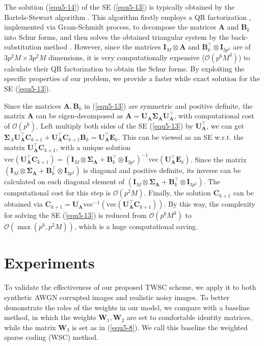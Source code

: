 The solution (\ref{equ5-14}) of the SE (\ref{equ5-13}) is typically obtained by the Bartels-Stewart algorithm \cite{Bartels1972}. This algorithm firstly employs a QR factorization \cite{GolubMatrix}, implemented via Gram-Schmidt process, to decompose the matrices $\bm{A}$ and $\bm{B}_{k}$ into Schur forms, and then solves the obtained triangular system by the back-substitution method \cite{bareiss1968sylvester}. However, since the matrices $\bm{I}_{M}\otimes\bm{A}$ and $\bm{B}_{k}^{\top}\otimes\bm{I}_{3p^2}$ are of $3p^2M\times 3p^2M$ dimensions, it is very computationally expensive ($\mathcal{O}(p^6M^3)$) to calculate their QR factorization to obtain the Schur forms. By exploiting the specific properties of our problem, we provide a faster while exact solution for the SE (\ref{equ5-13}).

Since the matrices $\bm{A},\bm{B}_{k}$ in (\ref{equ5-13}) are symmetric and positive definite, the matrix $\bm{A}$ can be eigen-decomposed as $\bm{A}=\bm{U}_{\bm{A}}\bm{\Sigma}_{\bm{A}}\bm{U}_{\bm{A}}^{\top}$, with computational cost of $\mathcal{O}(p^6)$. Left multiply both sides of the SE (\ref{equ5-13}) by $\bm{U}_{\bm{A}}^{\top}$, we can get
$
\bm{\Sigma}_{A}\bm{U}_{\bm{A}}^{\top}\bm{C}_{k+1}
+
\bm{U}_{\bm{A}}^{\top}\bm{C}_{k+1}\bm{B}_{k}
=
\bm{U}_{\bm{A}}^{\top}\bm{E}_{k}
$.
This can be viewed as an SE w.r.t. the matrix $\bm{U}_{\bm{A}}^{\top}\bm{C}_{k+1}$, with a unique solution
$
\text{vec}(\bm{U}_{\bm{A}}^{\top}\bm{C}_{k+1})=(\bm{I}_{M}\otimes\bm{\Sigma}_{\bm{A}}
+
\bm{B}_{k}^{\top}\otimes\bm{I}_{3p^2})^{-1}
\text{vec}(\bm{U}_{\bm{A}}^{\top}\bm{E}_{k})
$.
Since the matrix $(\bm{I}_{M}\otimes\bm{\Sigma}_{\bm{A}}
+
\bm{B}_{k}^{\top}\otimes\bm{I}_{3p^2})$ is diagonal and positive definite, its inverse can be calculated on each diagonal element of 
$(\bm{I}_{M}\otimes\bm{\Sigma}_{\bm{A}}
+
\bm{B}_{k}^{\top}\otimes\bm{I}_{3p^2})$. The computational cost for this step is $\mathcal{O}(p^2M)$. Finally, the solution $\bm{C}_{k+1}$ can be obtained via
$
\bm{C}_{k+1}=\bm{U}_{\bm{A}}\text{vec}^{-1}(\text{vec}(\bm{U}_{\bm{A}}^{\top}\bm{C}_{k+1}))
$.
By this way, the complexity for solving the SE (\ref{equ5-13}) is reduced from $\mathcal{O}(p^6M^3)$ to $\mathcal{O}(\max(p^6,p^2M))$, which is a huge computational saving.


\section{Experiments}

To validate the effectiveness of our proposed TWSC scheme, we apply it to both synthetic AWGN corrupted images and realistic noisy images. To better demonstrate the roles of the weights in our model, we compare with a baseline method, in which the weights $\bm{W}_{1},\bm{W}_{2}$ are set to comfortable identity matrices, while the matrix $\bm{W}_{3}$ is set as in (\ref{equ5-8}). We call this baseline the weighted sparse coding (WSC) method.

